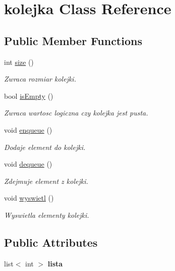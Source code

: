 \hypertarget{classkolejka}{\section{kolejka \-Class \-Reference}
\label{classkolejka}
}
\subsection*{\-Public \-Member \-Functions}
\begin{DoxyCompactItemize}
\item 
int \hyperlink{classkolejka_a74bf7134474481c349d08d0fd321390e}{size} ()
\begin{DoxyCompactList}\small\item\em \-Zwraca rozmiar kolejki. \end{DoxyCompactList}\item 
bool \hyperlink{classkolejka_a19e765402e19db4ed369755eebbf8725}{is\-Empty} ()
\begin{DoxyCompactList}\small\item\em \-Zwraca wartosc logiczna czy kolejka jest pusta. \end{DoxyCompactList}\item 
void \hyperlink{classkolejka_ad2a026f7b7cafb8ee9a7f9935eceb315}{enqueue} ()
\begin{DoxyCompactList}\small\item\em \-Dodaje element do kolejki. \end{DoxyCompactList}\item 
void \hyperlink{classkolejka_a13ed72f59f2013ad30972a796ccc2742}{dequeue} ()
\begin{DoxyCompactList}\small\item\em \-Zdejmuje element z kolejki. \end{DoxyCompactList}\item 
void \hyperlink{classkolejka_ab3c9b682b9a2ce5e6591cdf5fcb31146}{wyswietl} ()
\begin{DoxyCompactList}\small\item\em \-Wyswietla elementy kolejki. \end{DoxyCompactList}\end{DoxyCompactItemize}
\subsection*{\-Public \-Attributes}
\begin{DoxyCompactItemize}
\item 
\hypertarget{classkolejka_ab85208f9182a49e67f860c74b94ac0ec}{list$<$ int $>$ {\bfseries lista}}\label{classkolejka_ab85208f9182a49e67f860c74b94ac0ec}

\end{DoxyCompactItemize}


